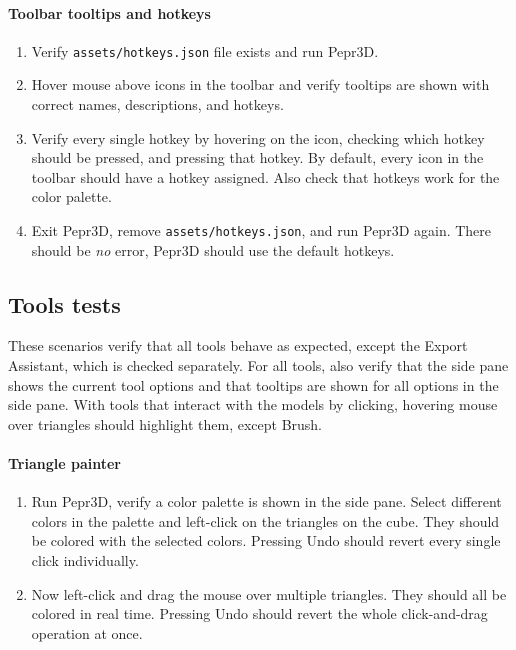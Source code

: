 \paragraph{Toolbar tooltips and hotkeys}

\begin{enumerate}
\item Verify \texttt{assets/hotkeys.json} file exists and run Pepr3D.
\item Hover mouse above icons in the toolbar and verify tooltips are shown with correct names, descriptions, and hotkeys.
\item Verify every single hotkey by hovering on the icon, checking which hotkey should be pressed, and pressing that hotkey. By default, every icon in the toolbar should have a hotkey assigned. Also check that hotkeys work for the color palette.
\item Exit Pepr3D, remove \texttt{assets/hotkeys.json}, and run Pepr3D again. There should be \emph{no} error, Pepr3D should use the default hotkeys.
\end{enumerate}

\subsection{Tools tests}

These scenarios verify that all tools behave as expected, except the Export Assistant, which is checked separately.
For all tools, also verify that the side pane shows the current tool options and that tooltips are shown for all options in the side pane.
With tools that interact with the models by clicking, hovering mouse over triangles should highlight them, except Brush.

\paragraph{Triangle painter}

\begin{enumerate}
\item Run Pepr3D, verify a color palette is shown in the side pane. Select different colors in the palette and left-click on the triangles on the cube. They should be colored with the selected colors. Pressing Undo should revert every single click individually.
\item Now left-click and drag the mouse over multiple triangles. They should all be colored in real time. Pressing Undo should revert the whole click-and-drag operation at once.
\end{enumerate}

